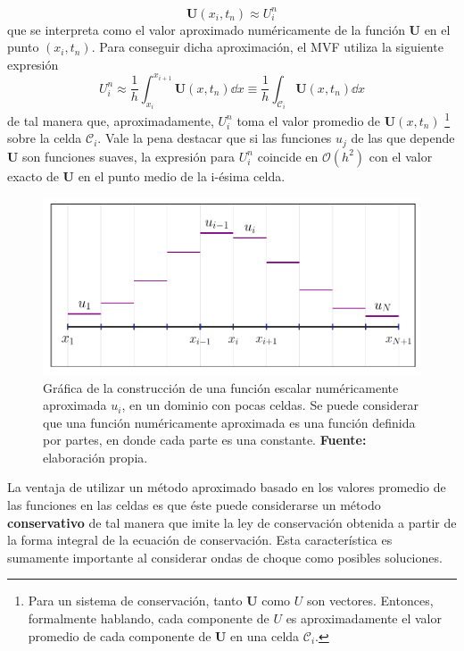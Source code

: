 \begin{equation}
	\mathbf{U}(x_i, t_n) \approx U_{i}^{n}
\end{equation}
que se interpreta como el valor aproximado numéricamente de la función $\mathbf{U}$ en el punto $(x_i, t_n)$. Para conseguir dicha aproximación, el MVF utiliza la siguiente expresión
\begin{equation}
	U_{i}^{n} \approx \frac{1}{h}\int_{x_i}^{x_{i+1}}\mathbf{U}(x, t_n)\dd{x} \equiv \frac{1}{h}\int_{\mathcal{C}_i}\mathbf{U}(x, t_n)\dd{x}
\end{equation}
de tal manera que, aproximadamente, $U_i^n$ toma el valor promedio de $\mathbf{U}(x,t_n)$ \footnote{Para un sistema de conservación, tanto $\mathbf{U}$ como $U$ son vectores. Entonces, formalmente hablando, cada componente de $U$ es aproximadamente el valor promedio de cada componente de $\mathbf{U}$ en una celda $\mathcal{C}_i$.} sobre la celda $\mathcal{C}_i$. Vale la pena destacar que si las funciones $u_j$ de las que depende $\mathbf{U}$ son funciones suaves, la expresión para $U_i^n$ coincide en $\mathcal{O}(h^2)$ con el valor exacto de $\mathbf{U}$ en el punto medio de la i-ésima celda.

\begin{figure}[ht]
	\centering
	\includegraphics[width=\linewidth]{../some_plots/cap2/graficas/numeric_U.pdf}
	\caption{Gráfica de la construcción de una función escalar numéricamente aproximada $u_i$, en un dominio con pocas celdas. Se puede considerar que una función numéricamente aproximada es una función definida por partes, en donde cada parte es una constante. \textbf{Fuente:} elaboración propia.}
	\label{fig:discretizacion-de-U}
\end{figure}

La ventaja de utilizar un método aproximado basado en los valores promedio de las funciones en las celdas es que éste puede considerarse un método \textbf{conservativo} de tal manera que imite la ley de conservación obtenida a partir de la forma integral de la ecuación de conservación. Esta característica es sumamente importante al considerar ondas de choque como posibles soluciones.

